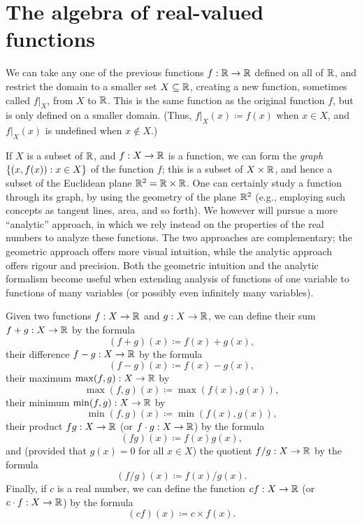 \section{The algebra of real-valued functions}\label{i:sec:9.2}

\begin{note}
  We can take any one of the previous functions \(f : \mathbb{R} \to \mathbb{R}\) defined on all of \(\mathbb{R}\), and restrict the domain to a smaller set \(X \subseteq \mathbb{R}\), creating a new function, sometimes called \(f|_X\), from \(X\) to \(\mathbb{R}\).
  This is the same function as the original function \(f\), but is only defined on a smaller domain.
  (Thus, \(f|_X(x) \coloneqq f(x)\) when \(x \in X\), and \(f|_X(x)\) is undefined when \(x \notin X\).)
\end{note}

\begin{note}
  If \(X\) is a subset of \(\mathbb{R}\), and \(f : X \to \mathbb{R}\) is a function, we can form the \emph{graph} \(\left\lbrace(x, f(x)) : x \in X\right\rbrace\) of the function \(f\);
  this is a subset of \(X \times \mathbb{R}\), and hence a subset of the Euclidean plane \(\mathbb{R}^2 = \mathbb{R} \times \mathbb{R}\).
  One can certainly study a function through its graph, by using the geometry of the plane \(\mathbb{R}^2\)
  (e.g., employing such concepts as tangent lines, area, and so forth).
  We however will pursue a more ``analytic'' approach, in which we rely instead on the properties of the real numbers to analyze these functions.
  The two approaches are complementary;
  the geometric approach offers more visual intuition, while the analytic approach offers rigour and precision.
  Both the geometric intuition and the analytic formalism become useful when extending analysis of functions of one variable to functions of many variables
  (or possibly even infinitely many variables).
\end{note}

\begin{defn}\label{i:9.2.1}
  Given two functions \(f : X \to \mathbb{R}\) and \(g : X \to \mathbb{R}\), we can define their sum \(f + g : X \to \mathbb{R}\) by the formula
  \[
    (f + g)(x) \coloneqq f(x) + g(x),
  \]
  their difference \(f - g : X \to \mathbb{R}\) by the formula
  \[
    (f - g)(x) \coloneqq f(x) - g(x),
  \]
  their maximum \(\max(f, g) : X \to \mathbb{R}\) by
  \[
    \max(f, g)(x) \coloneqq \max(f(x), g(x)),
  \]
  their minimum \(\min(f, g) : X \to \mathbb{R}\) by
  \[
    \min(f, g)(x) \coloneqq \min(f(x), g(x)),
  \]
  their product \(fg : X \to \mathbb{R}\) (or \(f \cdot g : X \to \mathbb{R}\)) by the formula
  \[
    (fg)(x) \coloneqq f(x)g(x),
  \]
  and (provided that \(g(x) = 0\) for all \(x \in X\)) the quotient \(f / g : X \to \mathbb{R}\) by the formula
  \[
    (f / g)(x) \coloneqq f(x) / g(x).
  \]
  Finally, if \(c\) is a real number, we can define the function \(cf : X \to \mathbb{R}\) (or \(c \cdot f : X \to \mathbb{R}\)) by the formula
  \[
    (cf)(x) \coloneqq c \times f(x).
  \]
\end{defn}

